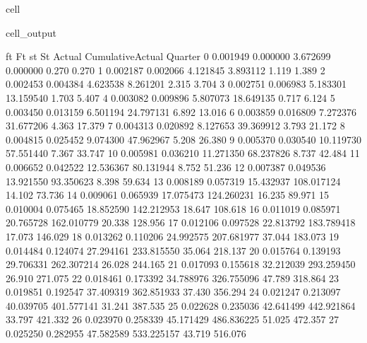 \documentclass[letterpaper,10pt,english]{jupyterBook}
\begin{document}
\begin{sphinxuseclass}{cell}
\begin{sphinxVerbatimOutput}
\begin{sphinxuseclass}{cell_output}
\begin{sphinxVerbatim}[commandchars=\\\{\}]
               ft        Ft         st           St  Actual  CumulativeActual  \PYGZbs{}
Quarter                                                                         
0        0.001949  0.000000   3.672699     0.000000   0.270             0.270   
1        0.002187  0.002066   4.121845     3.893112   1.119             1.389   
2        0.002453  0.004384   4.623538     8.261201   2.315             3.704   
3        0.002751  0.006983   5.183301    13.159540   1.703             5.407   
4        0.003082  0.009896   5.807073    18.649135   0.717             6.124   
5        0.003450  0.013159   6.501194    24.797131   6.892            13.016   
6        0.003859  0.016809   7.272376    31.677206   4.363            17.379   
7        0.004313  0.020892   8.127653    39.369912   3.793            21.172   
8        0.004815  0.025452   9.074300    47.962967   5.208            26.380   
9        0.005370  0.030540  10.119730    57.551440   7.367            33.747   
10       0.005981  0.036210  11.271350    68.237826   8.737            42.484   
11       0.006652  0.042522  12.536367    80.131944   8.752            51.236   
12       0.007387  0.049536  13.921550    93.350623   8.398            59.634   
13       0.008189  0.057319  15.432937   108.017124  14.102            73.736   
14       0.009061  0.065939  17.075473   124.260231  16.235            89.971   
15       0.010004  0.075465  18.852590   142.212953  18.647           108.618   
16       0.011019  0.085971  20.765728   162.010779  20.338           128.956   
17       0.012106  0.097528  22.813792   183.789418  17.073           146.029   
18       0.013262  0.110206  24.992575   207.681977  37.044           183.073   
19       0.014484  0.124074  27.294161   233.815550  35.064           218.137   
20       0.015764  0.139193  29.706331   262.307214  26.028           244.165   
21       0.017093  0.155618  32.212039   293.259450  26.910           271.075   
22       0.018461  0.173392  34.788976   326.755096  47.789           318.864   
23       0.019851  0.192547  37.409319   362.851933  37.430           356.294   
24       0.021247  0.213097  40.039705   401.577141  31.241           387.535   
25       0.022628  0.235036  42.641499   442.921864  33.797           421.332   
26       0.023970  0.258339  45.171429   486.836225  51.025           472.357   
27       0.025250  0.282955  47.582589   533.225157  43.719           516.076   

\end{sphinxVerbatim}
\end{sphinxuseclass}
\end{sphinxVerbatimOutput}
\end{sphinxuseclass}
\end{document}
